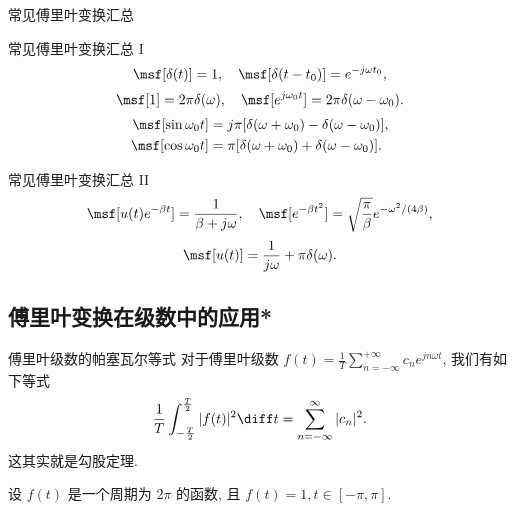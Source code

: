 \begin{frame}{常见傅里叶变换汇总}
	\onslide<+->
	\begin{algorithm}{常见傅里叶变换汇总 I}
		\[\msf[\delta(t)]=1,\quad \msf[\delta(t-t_0)]=e^{-j\omega t_0},\]
		\[\msf[1]=2\pi\delta(\omega),\quad \msf[e^{j\omega_0 t}]=2\pi\delta(\omega-\omega_0).\]
		\begin{align*}
		\msf[\sin \omega_0t]&=j\pi[\delta(\omega+\omega_0)-\delta(\omega-\omega_0)],\\
		\msf[\cos{\omega_0 t}]&=\pi[\delta(\omega+\omega_0)+\delta(\omega-\omega_0)].
		\end{align*}
	\end{algorithm}

	\onslide<+->
	\begin{main}{常见傅里叶变换汇总 II}
		\[\msf[u(t)e^{-\beta t}]=\dfrac1{\beta+j\omega},\quad
		\msf[e^{-\beta t^2}]=\sqrt{\dfrac\pi\beta}e^{-\omega^2/(4\beta)},\]
		\[\msf[u(t)]=\dfrac1{j\omega}+\pi\delta(\omega).\]
	\end{main}
\end{frame}


\subsection{傅里叶变换在级数中的应用*}
\begin{frame}{傅里叶级数的帕塞瓦尔等式\noexer}
	\onslide<+->
	对于傅里叶级数 $\displaystyle f(t)=\frac 1T\sum_{n=-\infty}^{+\infty}c_n e^{jn\omega t}$, 我们有如下等式
	\[\frac1{T}\int_{-\frac T2}^{\frac T2}|f(t)|^2\diff t=\sum_{n=-\infty}^{\infty}|c_n|^2.\]
	\onslide<+->
	这其实就是勾股定理.
	\onslide<+->
	\begin{example}
		设 $f(t)$ 是一个周期为 $2\pi$ 的函数, 且 $f(t)=1,t\in[-\pi,\pi]$.
		\vspace{-\baselineskip}
	\end{example}
\end{frame}


